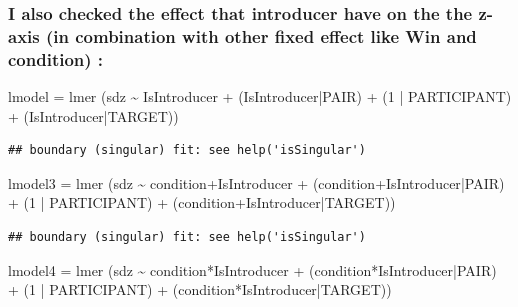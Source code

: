 \documentclass[
]{article}
\newenvironment{Shaded}{\begin{snugshade}}{\end{snugshade}}
\newcommand{\DecValTok}[1]{\textcolor[rgb]{0.00,0.00,0.81}{#1}}
\newcommand{\FunctionTok}[1]{\textcolor[rgb]{0.00,0.00,0.00}{#1}}
\newcommand{\NormalTok}[1]{#1}
\newcommand{\OtherTok}[1]{\textcolor[rgb]{0.56,0.35,0.01}{#1}}
\newcommand{\SpecialCharTok}[1]{\textcolor[rgb]{0.00,0.00,0.00}{#1}}
\begin{document}
\hypertarget{i-also-checked-the-effect-that-introducer-have-on-the-the-z-axis-in-combination-with-other-fixed-effect-like-win-and-condition}{%
\subsubsection{I also checked the effect that introducer have on the the
z-axis (in combination with other fixed effect like Win and condition)
:}\label{i-also-checked-the-effect-that-introducer-have-on-the-the-z-axis-in-combination-with-other-fixed-effect-like-win-and-condition}}

\begin{Shaded}
\begin{Highlighting}[]
\NormalTok{lmodel }\OtherTok{=}  \FunctionTok{lmer}\NormalTok{ (sdz }\SpecialCharTok{\textasciitilde{}}\NormalTok{   IsIntroducer }\SpecialCharTok{+}\NormalTok{ (IsIntroducer}\SpecialCharTok{|}\NormalTok{PAIR) }\SpecialCharTok{+}\NormalTok{ (}\DecValTok{1} \SpecialCharTok{|}\NormalTok{ PARTICIPANT) }\SpecialCharTok{+}\NormalTok{ (IsIntroducer}\SpecialCharTok{|}\NormalTok{TARGET))}
\end{Highlighting}
\end{Shaded}

\begin{verbatim}
## boundary (singular) fit: see help('isSingular')
\end{verbatim}

\begin{Shaded}
\begin{Highlighting}[]
\NormalTok{lmodel3 }\OtherTok{=}  \FunctionTok{lmer}\NormalTok{ (sdz }\SpecialCharTok{\textasciitilde{}}\NormalTok{   condition}\SpecialCharTok{+}\NormalTok{IsIntroducer }\SpecialCharTok{+}\NormalTok{ (condition}\SpecialCharTok{+}\NormalTok{IsIntroducer}\SpecialCharTok{|}\NormalTok{PAIR) }\SpecialCharTok{+}\NormalTok{ (}\DecValTok{1} \SpecialCharTok{|}\NormalTok{ PARTICIPANT) }\SpecialCharTok{+}\NormalTok{ (condition}\SpecialCharTok{+}\NormalTok{IsIntroducer}\SpecialCharTok{|}\NormalTok{TARGET))}
\end{Highlighting}
\end{Shaded}

\begin{verbatim}
## boundary (singular) fit: see help('isSingular')
\end{verbatim}

\begin{Shaded}
\begin{Highlighting}[]
\NormalTok{lmodel4 }\OtherTok{=}  \FunctionTok{lmer}\NormalTok{ (sdz }\SpecialCharTok{\textasciitilde{}}\NormalTok{   condition}\SpecialCharTok{*}\NormalTok{IsIntroducer }\SpecialCharTok{+}\NormalTok{ (condition}\SpecialCharTok{*}\NormalTok{IsIntroducer}\SpecialCharTok{|}\NormalTok{PAIR) }\SpecialCharTok{+}\NormalTok{ (}\DecValTok{1} \SpecialCharTok{|}\NormalTok{ PARTICIPANT) }\SpecialCharTok{+}\NormalTok{ (condition}\SpecialCharTok{*}\NormalTok{IsIntroducer}\SpecialCharTok{|}\NormalTok{TARGET))}
\end{Highlighting}
\end{Shaded}
\end{document}
